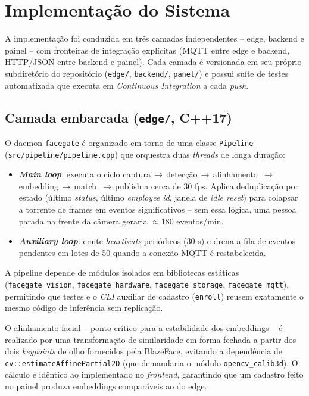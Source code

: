 \documentclass[12pt,a4paper]{report}
\begin{document}
\section{Implementação do Sistema}

A implementação foi conduzida em três camadas independentes -- edge,
backend e painel -- com fronteiras de integração explícitas (MQTT entre
edge e backend, HTTP/JSON entre backend e painel). Cada camada é
versionada em seu próprio subdiretório do repositório
(\texttt{edge/}, \texttt{backend/}, \texttt{panel/}) e possui suíte de
testes automatizada que executa em \textit{Continuous Integration} a
cada \textit{push}.

\subsection{Camada embarcada (\texttt{edge/}, C++17)}
\label{sec:camada-edge}

O daemon \texttt{facegate} é organizado em torno de uma classe
\texttt{Pipeline} (\texttt{src/pipeline/pipeline.cpp}) que orquestra
duas \textit{threads} de longa duração:

\begin{itemize}
    \item \textbf{\textit{Main loop}}: executa o ciclo
        captura\,$\rightarrow$\,detecção\,$\rightarrow$\,alinhamento
        \,$\rightarrow$\,embedding\,$\rightarrow$\,match
        \,$\rightarrow$\,publish a cerca de 30 fps. Aplica deduplicação
        por estado (último \textit{status}, último \textit{employee
        id}, janela de \textit{idle reset}) para colapsar a torrente de
        frames em eventos significativos -- sem essa lógica, uma pessoa
        parada na frente da câmera geraria $\approx$180 eventos/min.
    \item \textbf{\textit{Auxiliary loop}}: emite \textit{heartbeats}
        periódicos (30 s) e drena a fila de eventos pendentes em lotes
        de 50 quando a conexão MQTT é restabelecida.
\end{itemize}

A pipeline depende de módulos isolados em bibliotecas estáticas
(\texttt{facegate\_vision}, \texttt{facegate\_hardware},
\texttt{facegate\_storage}, \texttt{facegate\_mqtt}), permitindo que
testes e o \textit{CLI} auxiliar de cadastro (\texttt{enroll}) reusem
exatamente o mesmo código de inferência sem replicação.

O alinhamento facial -- ponto crítico para a estabilidade dos
embeddings -- é realizado por uma transformação de similaridade em
forma fechada a partir dos dois \textit{keypoints} de olho fornecidos
pela BlazeFace, evitando a dependência de
\texttt{cv::estimateAffinePartial2D} (que demandaria o módulo
\texttt{opencv\_calib3d}). O cálculo é idêntico ao implementado no
\textit{frontend}, garantindo que um cadastro feito no painel produza
embeddings comparáveis ao do edge.
\end{document}
